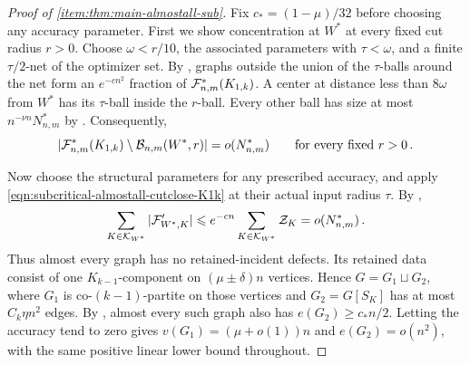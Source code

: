 \begin{proof}[Proof of  \ref{item:thm:main-almostall-sub}]
Fix $c_\ast=(1-\mu)/32$ before choosing any accuracy parameter. First we show concentration at $W^\ast$ at every fixed cut radius $r>0$. Choose $\omega<r/10$, the associated parameters with $\tau<\omega$, and a finite $\tau/2$-net of the optimizer set. By , graphs outside the union of the $\tau$-balls around the net form an $e^{-cn^2}$ fraction of ${\mathcal F}^\ast_{n,m}(K_{1,k})$. A center at distance less than $8\omega$ from $W^\ast$ has its $\tau$-ball inside the $r$-ball. Every other ball has size at most $n^{-\nu n}N^\ast_{n,m}$ by . Consequently,
\begin{equation}\label{eqn:subcritical-almostall-cutclose-K1k}
|{\mathcal F}^\ast_{n,m}(K_{1,k})\setminus{\mathcal B}_{n,m}(W^\ast,r)|=o(N^\ast_{n,m})\qquad\text{for every fixed }r>0\,.
\end{equation}

Now choose the structural parameters for any prescribed accuracy, and apply \eqref{eqn:subcritical-almostall-cutclose-K1k} at their actual input radius $\tau$. By ,
$$\sum_{K\in{\mathcal K}_{W^\ast}}|{\mathcal F}'_{W^\ast,K}|\leqslant e^{-cn}\sum_{K\in{\mathcal K}_{W^\ast}}{\mathcal Z}_K=o(N^\ast_{n,m})\,.$$
Thus almost every graph has no retained-incident defects. Its retained data consist of one $K_{k-1}$-component on $(\mu\pm\delta)n$ vertices. Hence $G=G_1\sqcup G_2$, where $G_1$ is co-$(k-1)$-partite on those vertices and $G_2=G[S_K]$ has at most $C_k\eta n^2$ edges. By , almost every such graph also has $e(G_2)\geq c_\ast n/2$. Letting the accuracy tend to zero gives $v(G_1)=(\mu+o(1))n$ and $e(G_2)=o(n^2)$, with the same positive linear lower bound throughout.
\end{proof}
